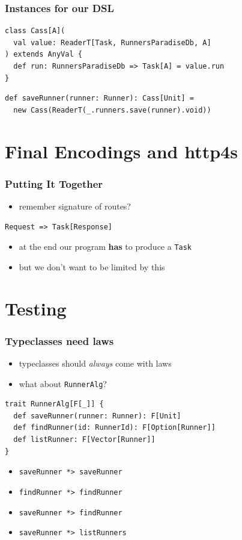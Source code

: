 \documentclass{beamer}
\begin{document}
\begin{frame}
  \frametitle{Instances for our DSL}
\begin{verbatim}
class Cass[A](
  val value: ReaderT[Task, RunnersParadiseDb, A]
) extends AnyVal {
  def run: RunnersParadiseDb => Task[A] = value.run
}
\end{verbatim}
  \vfill
\begin{verbatim}
def saveRunner(runner: Runner): Cass[Unit] =
  new Cass(ReaderT(_.runners.save(runner).void))
\end{verbatim}
\end{frame}

\section{Final Encodings and http4s}

\begin{frame}[fragile]
  \frametitle{Putting It Together}
  \begin{itemize}
  \item remember signature of routes?
  \end{itemize}
\begin{verbatim}
Request => Task[Response]
\end{verbatim}
  \begin{itemize}
  \item at the end our program \textbf{has} to produce a \texttt{Task}
  \item but we don't want to be limited by this
  \end{itemize}
\end{frame}

\section{Testing}

\begin{frame}[fragile]
  \frametitle{Typeclasses need laws}
  \begin{itemize}
  \item<1-> typeclasses should \textit{always} come with laws
  \item<1-> what about \texttt{RunnerAlg}?
  \end{itemize}
\begin{verbatim}
trait RunnerAlg[F[_]] {
  def saveRunner(runner: Runner): F[Unit]
  def findRunner(id: RunnerId): F[Option[Runner]]
  def listRunner: F[Vector[Runner]]
}
\end{verbatim}
  \begin{itemize}
  \item<2-> \texttt{saveRunner *> saveRunner}
  \item<2-> \texttt{findRunner *> findRunner}
  \item<2-> \texttt{saveRunner *> findRunner}
  \item<2-> \texttt{saveRunner *> listRunners}
  \end{itemize}
\end{frame}
\end{document}
